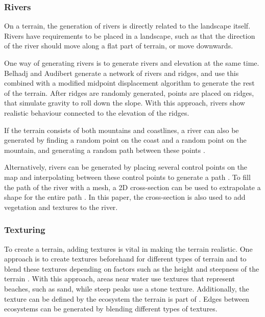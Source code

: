 \documentclass{article}
\begin{document}
\subsubsection{Rivers}
On a terrain, the generation of rivers is directly related to the landscape itself. Rivers have requirements to be placed in a landscape, such as that the direction of the river should move along a flat part of terrain, or move downwards.

One way of generating rivers is to generate rivers and elevation at the same time. Belhadj and Audibert \cite{belhadj_modeling_2005} generate a network of rivers and ridges, and use this combined with a modified midpoint displacement algorithm to generate the rest of the terrain. After ridges are randomly generated, points are placed on ridges, that simulate gravity to roll down the slope. With this approach, rivers show realistic behaviour connected to the elevation of the ridges.

If the terrain consists of both mountains and coastlines, a river can also be generated by finding a random point on the coast and a random point on the mountain, and generating a random path between these points \cite{doran_controlled_2010} \cite{prusinkiewicz_fractal_1993}.

Alternatively, rivers can be generated by placing several control points on the map and interpolating between these control points to generate a path \cite{smelik_declarative_2011}. To fill the path of the river with a mesh, a 2D cross-section can be used to extrapolate a shape for the entire path \cite{huijser_procedural_2010}. In this paper, the cross-section is also used to add vegetation and textures to the river.





\subsubsection{Texturing}
To create a terrain, adding textures is vital in making the terrain realistic. One approach is to create textures beforehand for different types of terrain and to blend these textures depending on factors such as the height and steepness of the terrain \cite{schneider_real-time_2006} \cite{kahoun_realtime_2013}. With this approach, areas near water use textures that represent beaches, such as sand, while steep peaks use a stone texture. Additionally, the texture can be defined by the ecosystem the terrain is part of \cite{hammes_modeling_2001}. Edges between ecosystems can be generated by blending different types of textures.
\end{document}
